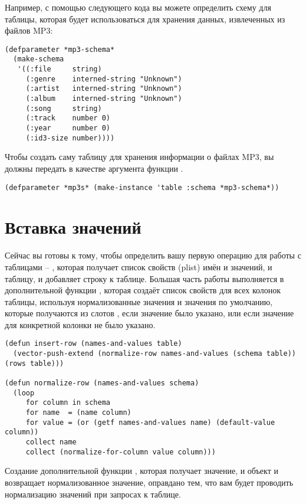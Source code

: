 Например, с помощью следующего кода вы можете определить схему для таблицы, которая будет
использоваться для хранения данных, извлеченных из файлов MP3:

\begin{lstlisting}
(defparameter *mp3-schema* 
  (make-schema 
   '((:file     string)
     (:genre    interned-string "Unknown")
     (:artist   interned-string "Unknown")
     (:album    interned-string "Unknown")
     (:song     string)
     (:track    number 0)
     (:year     number 0)
     (:id3-size number))))
\end{lstlisting}

Чтобы создать саму таблицу для хранения информации о файлах MP3, вы должны передать
 в качестве аргумента  функции .

\begin{lstlisting}
(defparameter *mp3s* (make-instance 'table :schema *mp3-schema*))
\end{lstlisting}

\section{Вставка значений}

Сейчас вы готовы к тому, чтобы определить вашу первую операцию для работы с таблицами --
, которая получает список свойств (plist) имён и значений, и таблицу, и
добавляет строку к таблице.  Большая часть работы выполняется в дополнительной функции
, которая создаёт список свойств для всех колонок таблицы, используя
нормализованные значения и значения по умолчанию, которые получаются из слотов
, если значение было указано, или  если
значение для конкретной колонки не было указано.

\begin{lstlisting}
(defun insert-row (names-and-values table)
  (vector-push-extend (normalize-row names-and-values (schema table)) (rows table)))

(defun normalize-row (names-and-values schema)
  (loop
     for column in schema
     for name  = (name column)
     for value = (or (getf names-and-values name) (default-value column))
     collect name
     collect (normalize-for-column value column)))
\end{lstlisting}

Создание дополнительной функции , которая получает значение, и
объект  и возвращает нормализованное значение, оправдано тем, что вам будет
проводить нормализацию значений при запросах к таблице.

